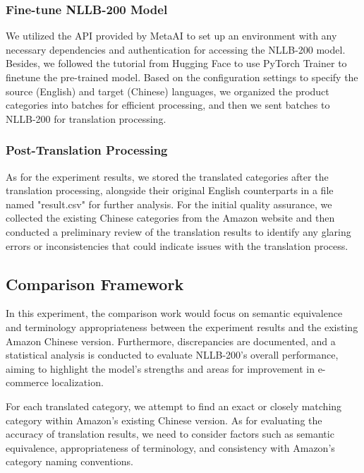\documentclass[sigconf]{acmart}
\begin{document}
\subsubsection{Fine-tune NLLB-200 Model}
We utilized the API provided by MetaAI to set up an environment with any necessary dependencies and authentication for accessing the NLLB-200 model. Besides, we followed the tutorial from Hugging Face to use PyTorch Trainer to finetune the pre-trained model\cite{Hugging_Face}. Based on the configuration settings to specify the source (English) and target (Chinese) languages, we organized the product categories into batches for efficient processing, and then we sent batches to NLLB-200 for translation processing.

\subsubsection{Post-Translation Processing}
As for the experiment results, we stored the translated categories after the translation processing, alongside their original English counterparts in a file named "result.csv" for further analysis. For the initial quality assurance, we collected the existing Chinese categories from the Amazon website and then conducted a preliminary review of the translation results to identify any glaring errors or inconsistencies that could indicate issues with the translation process.


\subsection{Comparison Framework}
In this experiment, the comparison work would focus on semantic equivalence and terminology appropriateness between the experiment results and the existing Amazon Chinese version. Furthermore, discrepancies are documented, and a statistical analysis is conducted to evaluate NLLB-200's overall performance, aiming to highlight the model's strengths and areas for improvement in e-commerce localization.

For each translated category, we attempt to find an exact or closely matching category within Amazon's existing Chinese version. As for evaluating the accuracy of translation results, we need to consider factors such as semantic equivalence, appropriateness of terminology, and consistency with Amazon's category naming conventions.
\end{document}
